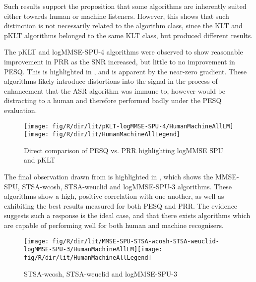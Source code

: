 Such results support the proposition that some algorithms are inherently
suited either towards human or machine listeners. However, this shows
that such distinction is not necessarily related to the algorithm
class, since the \ac{KLT} and \ac{pKLT} algorithms belonged to the
same \ac{KLT} class, but produced different results.

The \ac{pKLT} and \ac{logMMSE-SPU-4} algorithms were observed to
show reasonable improvement in \ac{PRR} as the \ac{SNR} increased,
but little to no improvement in \ac{PESQ}. This is highlighted in
, and is apparent by the near-zero
gradient. These algorithms likely introduce distortions into the signal
in the process of enhancement that the \ac{ASR} algorithm was immune
to, however would be distracting to a human and therefore performed
badly under the \ac{PESQ} evaluation.

\begin{figure}[p]
\noindent \begin{centering}
\texttt{[image: fig/R/dir/lit/pKLT-logMMSE-SPU-4/HumanMachineAllLM]}\texttt{[image: fig/R/dir/lit/HumanMachineAllLegend]}
\par\end{centering}

\protect\caption{\label{fig:direct-pklt-logmmse-spu-4}Direct comparison of \acs{PESQ}
vs. \acs{PRR} highlighting \acs{logMMSE} \acs{SPU} and \acs{pKLT}}
\end{figure}


The final observation drawn from  is highlighted
in , which shows the \ac{MMSE-SPU}, \ac{STSA-wcosh},
\ac{STSA-weuclid} and \ac{logMMSE-SPU-3} algorithms. These algorithms
show a high, positive correlation with one another, as well as exhibiting
the best results measured for both \ac{PESQ} and \ac{PRR}. The evidence
suggests such a response is the ideal case, and that there exists
algorithms which are capable of performing well for both human and
machine recognisers.

\begin{figure}[h]
\noindent \begin{centering}
\texttt{[image: fig/R/dir/lit/MMSE-SPU-STSA-wcosh-STSA-weuclid-logMMSE-SPU-3/HumanMachineAllLM]}\texttt{[image: fig/R/dir/lit/HumanMachineAllLegend]}
\par\end{centering}

\protect\caption{\label{fig:direct-highcorr}\acs{STSA-wcosh}, \acs{STSA-weuclid}
and \acs{logMMSE-SPU-3}}
\end{figure}


